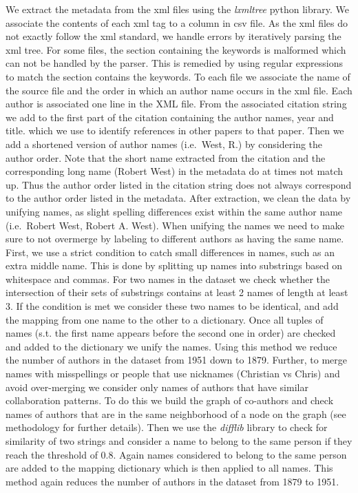 \documentclass[journal,twocolumn]{IEEEtran}
\begin{document}
We extract the metadata from the xml files using the \emph{lxmltree}
python library. We associate the contents of each xml tag to a column in
csv file. As the xml files do not exactly follow the xml standard, we
handle errors by iteratively parsing the xml tree. For some files, the
section containing the keywords is malformed which can not be handled by
the parser. This is remedied by using regular expressions to match the
section contains the keywords. To each file we associate the name of the
source file and the order in which an author name occurs in the xml
file. Each author is associated one line in the XML file. From the
associated citation string we add to the first part of the citation
containing the author names, year and title. which we use to identify
references in other papers to that paper. Then we add a shortened
version of author names (i.e.~West, R.) by considering the author order.
Note that the short name extracted from the citation and the
corresponding long name (Robert West) in the metadata do at times not
match up. Thus the author order listed in the citation string does not
always correspond to the author order listed in the metadata. After
extraction, we clean the data by unifying names, as slight spelling
differences exist within the same author name (i.e.~Robert West, Robert
A. West). When unifying the names we need to make sure to not overmerge
by labeling to different authors as having the same name. First, we use
a strict condition to catch small differences in names, such as an extra
middle name. This is done by splitting up names into substrings based on
whitespace and commas. For two names in the dataset we check whether the
intersection of their sets of substrings contains at least 2 names of
length at least 3. If the condition is met we consider these two names
to be identical, and add the mapping from one name to the other to a
dictionary. Once all tuples of names (s.t. the first name appears before
the second one in order) are checked and added to the dictionary we
unify the names. Using this method we reduce the number of authors in
the dataset from 1951 down to 1879. Further, to merge names with
misspellings or people that use nicknames (Christian vs Chris) and avoid
over-merging we consider only names of authors that have similar
collaboration patterns. To do this we build the graph of co-authors and
check names of authors that are in the same neighborhood of a node on
the graph (see methodology for further details). Then we use the
\emph{difflib} library to check for similarity of two strings and
consider a name to belong to the same person if they reach the threshold
of 0.8. Again names considered to belong to the same person are added to
the mapping dictionary which is then applied to all names. This method
again reduces the number of authors in the dataset from 1879 to 1951.
\end{document}
